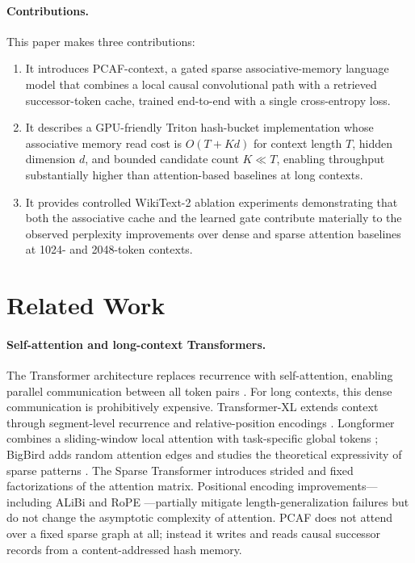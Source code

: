 \documentclass{article}
\begin{document}
\paragraph{Contributions.}
This paper makes three contributions:
\begin{enumerate}
  \item It introduces PCAF-context, a gated sparse associative-memory language
  model that combines a local causal convolutional path with a retrieved
  successor-token cache, trained end-to-end with a single cross-entropy loss.
  \item It describes a GPU-friendly Triton hash-bucket implementation whose
  associative memory read cost is $O(T + Kd)$ for context length $T$, hidden
  dimension $d$, and bounded candidate count $K \ll T$, enabling throughput
  substantially higher than attention-based baselines at long contexts.
  \item It provides controlled WikiText-2 ablation experiments demonstrating
  that both the associative cache and the learned gate contribute materially to
  the observed perplexity improvements over dense and sparse attention
  baselines at 1024- and 2048-token contexts.
\end{enumerate}

\section{Related Work}

\paragraph{Self-attention and long-context Transformers.}
The Transformer architecture replaces recurrence with self-attention, enabling
parallel communication between all token pairs
\citep{vaswani2017attention}. For long contexts, this dense communication is
prohibitively expensive. Transformer-XL extends context through segment-level
recurrence and relative-position encodings \citep{dai2019transformerxl}.
Longformer combines a sliding-window local attention with task-specific global
tokens \citep{beltagy2020longformer}; BigBird adds random attention edges and
studies the theoretical expressivity of sparse patterns
\citep{zaheer2020bigbird}. The Sparse Transformer \citep{child2019sparsetransformer}
introduces strided and fixed factorizations of the attention matrix. Positional
encoding improvements—including ALiBi \citep{press2021alibi} and RoPE
\citep{su2021roformer}—partially mitigate length-generalization failures but do
not change the asymptotic complexity of attention. PCAF does not attend over a
fixed sparse graph at all; instead it writes and reads causal successor records
from a content-addressed hash memory.
\end{document}
